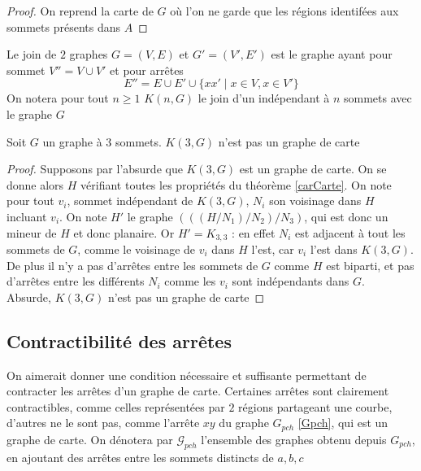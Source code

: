 \documentclass{scrartcl}
\begin{document}
\begin{flushleft}
\begin{proof}
    On reprend la carte de $G$ où l'on ne garde que les régions identifées aux sommets présents dans $A$
\end{proof}

\begin{def*}[Join]
    Le join de $2$ graphes $G = (V, E)$ et $G' = (V', E')$ est le graphe ayant pour sommet $V'' = V \cup V'$ et pour arrêtes
    \[ E'' = E \cup E' \cup \{ xx' \mid x \in V, x \in V' \} \]
    On notera pour tout $n \geq 1$ $K(n, G)$ le join d'un indépendant à $n$ sommets avec le graphe $G$
\end{def*}

\begin{prop}
    Soit $G$ un graphe à $3$ sommets. $K(3, G)$ n'est pas un graphe de carte
\end{prop}

\begin{proof}
    Supposons par l'absurde que $K(3, G)$ est un graphe de carte. On se donne alors $H$ vérifiant toutes les propriétés
    du théorème \ref{carCarte}. On note pour tout $v_i$, sommet indépendant de $K(3, G)$, $N_i$ son voisinage dans $H$
    incluant $v_i$. On note $H'$ le graphe $(((H / N_1) / N_2) / N_3)$, qui est donc un mineur de $H$ et donc planaire.
    Or $H' = K_{3,3}$ : en effet $N_i$ est adjacent à tout les sommets de $G$, comme le voisinage de $v_i$ dans $H$ l'est,
    car $v_i$ l'est dans $K(3, G)$. De plus il n'y a pas d'arrêtes entre les sommets de $G$ comme $H$ est biparti, et pas
    d'arrêtes entre les différents $N_i$ comme les $v_i$ sont indépendants dans $G$.\\
    Absurde, $K(3, G)$ n'est pas un graphe de carte
\end{proof}

\subsection{Contractibilité des arrêtes}

On aimerait donner une condition nécessaire et suffisante permettant de contracter les arrêtes d'un graphe de carte.
Certaines arrêtes sont clairement contractibles, comme celles représentées par $2$ régions partageant une courbe, d'autres ne le sont
pas, comme l'arrête $xy$ du graphe $G_{pch}$ \ref{Gpch}, qui est un graphe de carte.
On dénotera par $\mathcal{G}_{pch}$ l'ensemble des graphes obtenu depuis $G_{pch}$,
en ajoutant des arrêtes entre les sommets distincts de $a, b, c$


\end{flushleft}
\end{document}
